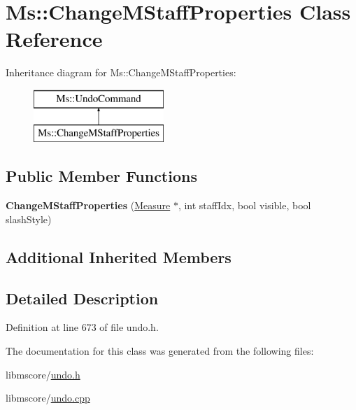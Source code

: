 \hypertarget{class_ms_1_1_change_m_staff_properties}{}\section{Ms\+:\+:Change\+M\+Staff\+Properties Class Reference}
\label{class_ms_1_1_change_m_staff_properties}
Inheritance diagram for Ms\+:\+:Change\+M\+Staff\+Properties\+:\begin{figure}[H]
\begin{center}
\leavevmode
\includegraphics[height=2.000000cm]{class_ms_1_1_change_m_staff_properties}
\end{center}
\end{figure}
\subsection*{Public Member Functions}
\begin{DoxyCompactItemize}
\item 
\mbox{\label{class_ms_1_1_change_m_staff_properties_aba9eb9208b0f5269059b20a9b8e3bcf1}} 
{\bfseries Change\+M\+Staff\+Properties} (\hyperlink{class_ms_1_1_measure}{Measure} $\ast$, int staff\+Idx, bool visible, bool slash\+Style)
\end{DoxyCompactItemize}
\subsection*{Additional Inherited Members}


\subsection{Detailed Description}


Definition at line 673 of file undo.\+h.



The documentation for this class was generated from the following files\+:\begin{DoxyCompactItemize}
\item 
libmscore/\hyperlink{undo_8h}{undo.\+h}\item 
libmscore/\hyperlink{undo_8cpp}{undo.\+cpp}\end{DoxyCompactItemize}
